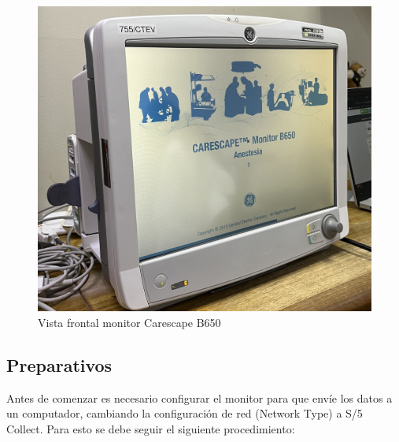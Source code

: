 \documentclass{article}
\begin{document}
\begin{figure}[h]
	\centering
    \includegraphics[scale=0.6]{img/carescape_b650.jpeg}
    \caption{Vista frontal monitor Carescape B650}
    \label{fig:b650_frontal}
\end{figure}

\subsection{Preparativos}
Antes de comenzar es necesario configurar el monitor para que envíe los datos a un computador, cambiando la configuración de red (Network Type) a S/5 Collect. Para esto se debe seguir el siguiente procedimiento:
\end{document}

